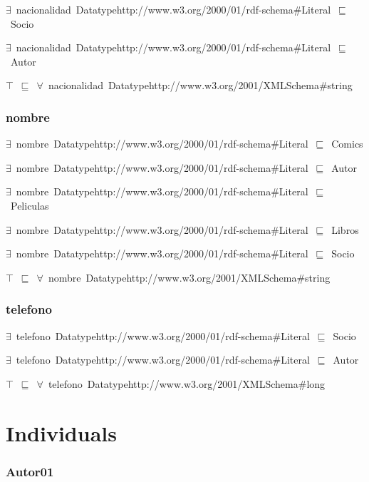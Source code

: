\documentclass{article}
\begin{document}
\ensuremath{\exists}~nacionalidad~Datatypehttp://www.w3.org/2000/01/rdf-schema#Literal~\ensuremath{\sqsubseteq}~Socio

\ensuremath{\exists}~nacionalidad~Datatypehttp://www.w3.org/2000/01/rdf-schema#Literal~\ensuremath{\sqsubseteq}~Autor

\ensuremath{\top}~\ensuremath{\sqsubseteq}~\ensuremath{\forall}~nacionalidad~Datatypehttp://www.w3.org/2001/XMLSchema#string

\subsubsection*{nombre}

\ensuremath{\exists}~nombre~Datatypehttp://www.w3.org/2000/01/rdf-schema#Literal~\ensuremath{\sqsubseteq}~Comics

\ensuremath{\exists}~nombre~Datatypehttp://www.w3.org/2000/01/rdf-schema#Literal~\ensuremath{\sqsubseteq}~Autor

\ensuremath{\exists}~nombre~Datatypehttp://www.w3.org/2000/01/rdf-schema#Literal~\ensuremath{\sqsubseteq}~Peliculas

\ensuremath{\exists}~nombre~Datatypehttp://www.w3.org/2000/01/rdf-schema#Literal~\ensuremath{\sqsubseteq}~Libros

\ensuremath{\exists}~nombre~Datatypehttp://www.w3.org/2000/01/rdf-schema#Literal~\ensuremath{\sqsubseteq}~Socio

\ensuremath{\top}~\ensuremath{\sqsubseteq}~\ensuremath{\forall}~nombre~Datatypehttp://www.w3.org/2001/XMLSchema#string

\subsubsection*{telefono}

\ensuremath{\exists}~telefono~Datatypehttp://www.w3.org/2000/01/rdf-schema#Literal~\ensuremath{\sqsubseteq}~Socio

\ensuremath{\exists}~telefono~Datatypehttp://www.w3.org/2000/01/rdf-schema#Literal~\ensuremath{\sqsubseteq}~Autor

\ensuremath{\top}~\ensuremath{\sqsubseteq}~\ensuremath{\forall}~telefono~Datatypehttp://www.w3.org/2001/XMLSchema#long

\section*{Individuals}\subsubsection*{Autor01}
\end{document}
